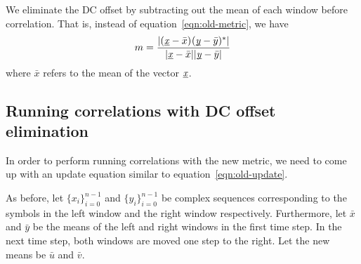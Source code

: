We eliminate the DC offset by subtracting out the mean of each window before
correlation. That is, instead of equation~\ref{eqn:old-metric}, we have
\begin{equation} \label{eqn:new-metric}
	m = \frac{|\corr{(\ue{x}-\bar{x})}{(\ue{y}-\bar{y})}|}
	         {|\ue{x}-\bar{x}||\ue{y}-\bar{y}|}
\end{equation}
where $\bar{x}$ refers to the mean of the vector $\underbar{\emph{x}}$.

\subsection{Running correlations with DC offset elimination}

In order to perform running correlations with the new metric, we need to
come up with an update equation similar to equation~\ref{eqn:old-update}.

As before, let $\{x_i\}_{i=0}^{n-1}$ and $\{y_i\}_{i=0}^{n-1}$ be complex
sequences corresponding to the symbols in the left window and the right window
respectively. Furthermore, let $\bar{x}$ and $\bar{y}$ be the means of the
left and right windows in the first time step. In the next time step, both
windows are moved one step to the right. Let the new means be $\bar{u}$ and
$\bar{v}$.

